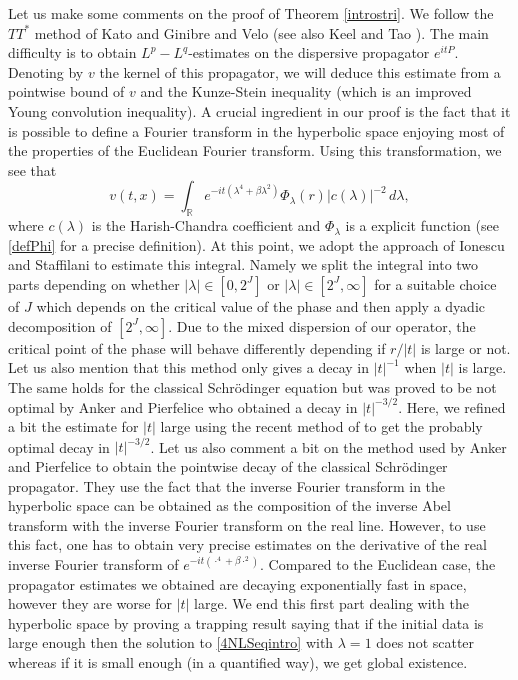 \documentclass[10pt,leqno]{amsart}
\numberwithin{equation}{section}
\newcommand{\field}[1]{\mathbb{#1}}
\newcommand{\R}{\field{R}}          		%
\begin{document}
Let us make some comments on the proof of Theorem \ref{introstri}. We follow the $TT^\ast$ method of Kato \cite{Kato} and Ginibre and Velo \cite{MR1151250} (see also Keel and Tao \cite{keel-tao}). The main difficulty is to obtain $L^p - L^q$-estimates on the dispersive propagator $e^{itP}$. Denoting by $v$ the kernel of this propagator, we will deduce this estimate from a pointwise bound of $v$ and the Kunze-Stein inequality (which is an improved Young convolution inequality). A crucial ingredient in our proof is the fact that it is possible to define a Fourier transform in the hyperbolic space enjoying most of the properties of the Euclidean Fourier transform. Using this transformation, we see that
$$v(t,x)=\int_{\R}  e^{-it (\lambda^4 +\beta \lambda^2 ) } \Phi_\lambda (r) |c(\lambda)|^{-2}\, d\lambda,$$
where $c(\lambda)$ is the Harish-Chandra coefficient and $\Phi_\lambda$ is a explicit function (see \eqref{defPhi} for a precise definition). At this point, we adopt the approach of Ionescu and Staffilani \cite{IS2009} to estimate this integral. Namely we split the integral into two parts depending on whether $|\lambda|\in [0,2^J]$ or  $|\lambda|\in [2^J,\infty]$ for a suitable choice of $J$ which depends on the critical value of the phase and then apply a dyadic decomposition of $[2^J ,\infty]$. Due to the mixed dispersion of our operator, the critical point of the phase will behave differently depending if $r/|t|$ is large or not. Let us also mention that this method only gives a decay in $|t|^{-1}$ when $|t|$ is large. The same holds for the classical Schr\" odinger equation but was proved to be not optimal by Anker and Pierfelice \cite{MR2566713} who obtained a decay in $|t|^{-3/2}$. Here, we refined a bit the estimate for $|t|$ large using the recent method of \cite{AMPVZ} to get the probably optimal decay in $|t|^{-3/2}$.   
Let us also comment a bit on the method used by Anker and Pierfelice \cite{MR2566713} to obtain the pointwise decay of the classical Schr\"odinger propagator. They use the fact that the inverse Fourier transform in the hyperbolic space can be obtained as the composition of the inverse Abel transform with the inverse Fourier transform on the real line. However, to use this fact, one has to obtain very precise estimates on the derivative of the real inverse Fourier transform of $e^{-it (\cdot^4 +\beta \cdot^2 ) } $. Compared to the Euclidean case, the propagator estimates we obtained are decaying exponentially fast in space, however they are worse for $|t|$ large.
 We end this first part dealing with the hyperbolic space by proving a trapping result saying that if the initial data is large enough then the solution to \eqref{4NLSeqintro} with $\lambda=1$ does not scatter whereas if it is small enough (in a quantified way), we get global existence. 
\end{document}
